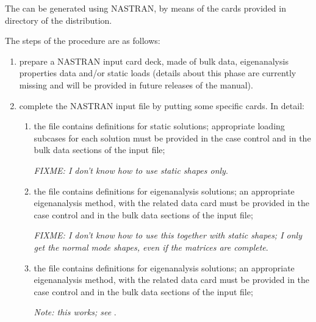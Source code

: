 The  can be generated using NASTRAN,
by means of the  cards provided in directory 
of the distribution.

The steps of the procedure are as follows:
\begin{enumerate} %

\item prepare a NASTRAN input card deck, made of bulk data,
eigenanalysis properties data and/or static loads (details about 
this phase are currently missing and will be provided in future 
releases of the manual).

\item complete the NASTRAN input file by putting some specific
 cards.
In detail:
\begin{enumerate}
\item the file  contains
	 definitions for static solutions; appropriate
	loading subcases for each solution must be provided
	in the case control and in the bulk data sections
	of the input file;

	\emph{FIXME: I don't know how to use static shapes only}.

\item the file  contains
	 definitions for eigenanalysis solutions;
	an appropriate eigenanalysis method, with the related
	data card must be provided in the case control 
	and in the bulk data sections of the input file;

	\emph{FIXME: I don't know how to use this together
		with static shapes; I only get the normal mode shapes,
		even if the matrices are complete}.

\item the file  contains
	 definitions for eigenanalysis solutions;
	an appropriate eigenanalysis method, with the related
	data card must be provided in the case control 
	and in the bulk data sections of the input file;

	\emph{Note: this works; see} .


\end{enumerate}
\end{enumerate}
